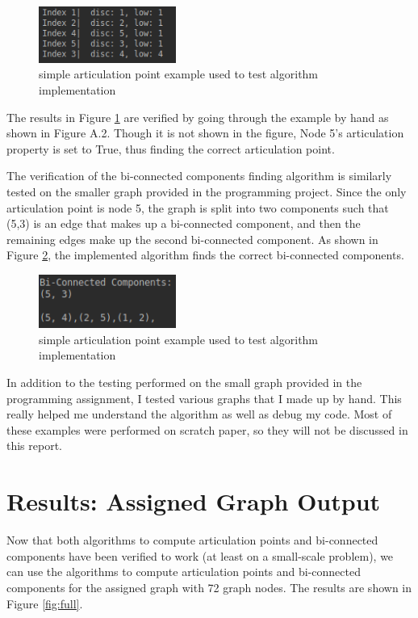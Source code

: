 \documentclass[]{article}
\begin{document}
\begin{figure}[h]
	\centering
	\includegraphics[width=0.4\textwidth]{articulation_ex}
		\caption{simple articulation point example used to test algorithm implementation}\label{fig:toy}
\end{figure}

The results in Figure \ref{fig:toy} are verified by going through the example by hand as shown in Figure A.2. Though it is not shown in the figure, Node 5's articulation property is set to True, thus finding the correct articulation point.

The verification of the bi-connected components finding algorithm is similarly tested on the smaller graph provided in the programming project. Since the only articulation point is node 5, the graph is split into two components such that (5,3) is an edge that makes up a bi-connected component, and then the remaining edges make up the second bi-connected component. As shown in Figure \ref{fig:toy_biconnected}, the implemented algorithm finds the correct bi-connected components.

\begin{figure}[h]
	\centering
	\includegraphics[width=0.4\textwidth]{biconnected_ex}
		\caption{simple articulation point example used to test algorithm implementation}\label{fig:toy_biconnected}
\end{figure}

In addition to the testing performed on the small graph provided in the programming assignment, I tested various graphs that I made up by hand. This really helped me understand the algorithm as well as debug my code. Most of these examples were performed on scratch paper, so they will not be discussed in this report.

\section{Results: Assigned Graph Output}
Now that both algorithms to compute articulation points and bi-connected components have been verified to work (at least on a small-scale problem), we can use the algorithms to compute articulation points and bi-connected components for the assigned graph with 72 graph nodes. The results are shown in Figure \ref{fig:full}.
\end{document}
